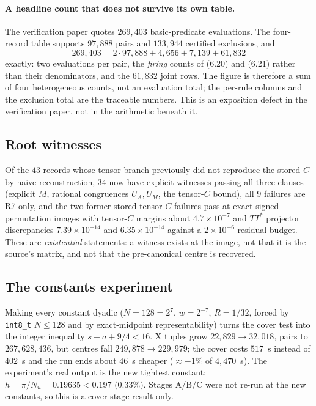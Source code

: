 \documentclass[10pt]{article}
\theoremstyle{definition}
\begin{document}
\paragraph{A headline count that does not survive its own table.} The verification paper quotes
$269{,}403$ basic-predicate evaluations. The four-record table supports $97{,}888$ pairs and
$133{,}944$ certified exclusions, and
\[269{,}403=2\cdot97{,}888+4{,}656+7{,}139+61{,}832\]
exactly: two evaluations per pair, the \emph{firing} counts of (6.20) and (6.21) rather than their
denominators, and the $61{,}832$ joint rows. The figure is therefore a sum of four heterogeneous
counts, not an evaluation total; the per-rule columns and the exclusion total are the traceable
numbers. This is an exposition defect in the verification paper, not in the arithmetic beneath it.

\subsection{Root witnesses}
Of the $43$ records whose tensor branch previously did not reproduce the stored $C$ by naive
reconstruction, $34$ now have explicit witnesses passing all three clauses (explicit $M$, rational
congruences $U_A,U_M$, the tensor-$C$ bound), all $9$ failures are R7-only, and the two former
stored-tensor-$C$ failures pass at exact signed-permutation images with tensor-$C$ margins about
$4.7\times10^{-7}$ and $TT^*$ projector discrepancies $7.39\times10^{-14}$ and
$6.35\times10^{-14}$ against a $2\times10^{-6}$ residual budget. These are \emph{existential}
statements: a witness exists at the image, not that it is the source's matrix, and not that the
pre-canonical centre is recovered.

\subsection{The constants experiment}
Making every constant dyadic ($N=128=2^7$, $w=2^{-7}$, $R=1/32$, forced by \texttt{int8\_t} $N\le128$
and by exact-midpoint representability) turns the cover test into the integer inequality
$s+a+9/4<16$. X tuples grow $22{,}829\to32{,}018$, pairs to $267{,}628{,}436$, but centres fall
$249{,}878\to229{,}979$; the cover costs $517$~s instead of $402$~s and the run ends about $46$~s
cheaper ($\approx-1\%$ of $4{,}470$~s). The experiment's real output is the new tightest constant:
$h=\pi/N_u=0.19635<0.197$ ($0.33\%$). Stages A/B/C were not re-run at the new constants, so this is a
cover-stage result only.
\end{document}
